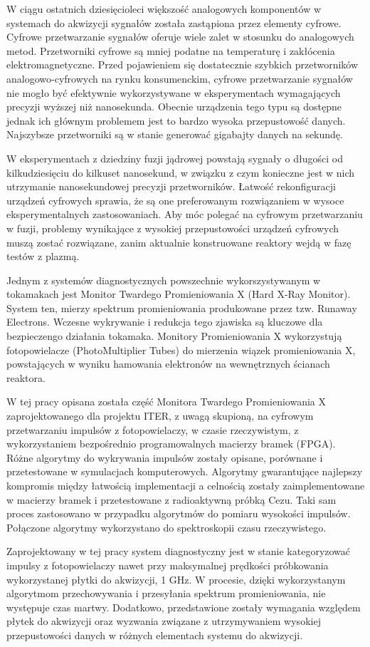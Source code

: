 W ciągu ostatnich dziesięcioleci większość analogowych komponentów
w systemach do akwizycji sygnałów została zastąpiona przez 
elementy cyfrowe. Cyfrowe przetwarzanie sygnałów oferuje
wiele zalet w stosunku do analogowych metod.
Przetworniki cyfrowe są mniej podatne na temperaturę i 
zakłócenia elektromagnetyczne.
Przed pojawieniem się dostatecznie szybkich przetworników analogowo-cyfrowych
na rynku konsumenckim, cyfrowe przetwarzanie sygnałów nie mogło być 
efektywnie wykorzystywane w eksperymentach wymagających precyzji 
wyższej niż nanosekunda. 
Obecnie urządzenia tego typu są dostępne jednak ich głównym problemem  
jest to bardzo wysoka przepustowość danych. Najszybsze przetworniki
są w stanie generować gigabajty danych na sekundę.


W eksperymentach z dziedziny fuzji jądrowej powstają sygnały
o długości od kilkudziesięciu do kilkuset nanosekund, w związku
z czym konieczne jest w nich utrzymanie nanosekundowej precyzji 
przetworników. Łatwość rekonfiguracji urządzeń cyfrowych 
sprawia, że są one preferowanym rozwiązaniem w wysoce eksperymentalnych
zastosowaniach. Aby móc polegać na cyfrowym przetwarzaniu
w fuzji, problemy wynikające z wysokiej przepustowości 
urządzeń cyfrowych muszą zostać rozwiązane, zanim aktualnie konstruowane
reaktory wejdą w fazę testów z plazmą.


Jednym z systemów diagnostycznych powszechnie wykorszystywanym w 
tokamakach jest Monitor Twardego Promieniowania X (Hard X-Ray Monitor).
System ten, mierzy spektrum promieniowania produkowane przez tzw. Runaway
Electrons. Wczesne wykrywanie i redukcja tego zjawiska są kluczowe
dla bezpieczengo działania tokamaka.
Monitory Promieniowania X wykorzystują fotopowielacze (PhotoMultiplier Tubes)
do mierzenia wiązek promieniowania X, powstających w wyniku hamowania
elektronów na wewnętrznych ścianach reaktora.


W tej pracy opisana została część Monitora Twardego Promieniowania X 
zaprojektowanego dla projektu ITER, z uwagą skupioną, na cyfrowym przetwarzaniu
impulsów z fotopowielaczy, w czasie rzeczywistym, z wykorzystaniem bezpośrednio
programowalnych macierzy bramek (FPGA). Różne algorytmy do wykrywania 
impulsów zostały opisane, porównane i przetestowane w symulacjach komputerowych.
Algorytmy gwarantujące najlepszy kompromis między łatwością implementacji 
a celnością zostały zaimplementowane w macierzy bramek i przetestowane 
z radioaktywną próbką Cezu. Taki sam proces zastosowano w przypadku
algorytmów do pomiaru wysokości impulsów. Połączone algorytmy wykorzystano
do spektroskopii czasu rzeczywistego.


Zaprojektowany w tej pracy system diagnostyczny jest w stanie kategoryzować 
impulsy z fotopowielaczy nawet przy maksymalnej prędkości próbkowania 
wykorzystanej płytki do akwizycji, 1 GHz. W procesie,
dzięki wykorzystanym algorytmom przechowywania i
przesyłania spektrum promieniowania, nie występuje czas martwy.
Dodatkowo, przedstawione zostały wymagania względem płytek do akwizycji oraz wyzwania
związane z utrzymywaniem wysokiej przepustowości danych w różnych elementach systemu
do akwizycji.


